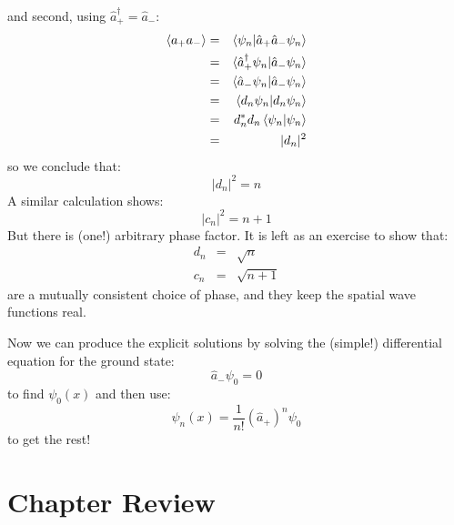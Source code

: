 \documentclass[12pt]{book}
\begin{document}
and second, using $\hat{a}_+^\dagger = \hat{a}_-$:
\begin{eqnarray*}
\braket{a_+a_-} &=& \braket{\psi_n | \hat{a}_+ \hat{a}_- \psi_n}\\
 &=& \braket{\hat{a}_+^\dagger \psi_n | \hat{a}_- \psi_n}\\
 &=& \braket{\hat{a}_- \psi_n | \hat{a}_- \psi_n}\\
 &=& \braket{d_n \psi_n | d_n \psi_n}\\
 &=& d_n^* d_n \braket{\psi_n | \psi_n}\\
 &=& |d_n|^2\\ 
\end{eqnarray*}
so we conclude that:
$$|d_n|^2 = n$$
A similar calculation shows:
$$|c_n|^2 = n+1$$
But there is (one!) arbitrary phase factor.  It is left as an exercise to show that:
\begin{eqnarray*}
d_n &=& \sqrt{n}\\
c_n &=& \sqrt{n+1} 
\end{eqnarray*}
are a mutually consistent choice of phase, and they keep the spatial wave functions real.

Now we can produce the explicit solutions by solving the (simple!) differential equation for the ground state:
$$\hat{a}_- \psi_0 = 0$$
to find $\psi_0(x)$ and then use:
$$\psi_n(x) = \frac{1}{n!}(\hat{a}_+)^n \psi_0$$
to get the rest!

\section{Chapter Review}
\end{document}
